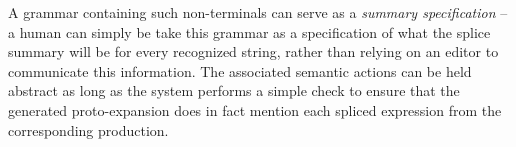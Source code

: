 \documentclass[acmlarge,review,anonymous]{acmart}\settopmatter{printfolios=true}
\begin{document}
A grammar containing such non-terminals can serve as a \emph{summary specification} -- a human can simply be take this grammar as a specification of what the splice summary will be for every recognized string, rather than relying on an editor to communicate this information. The associated semantic actions can be held abstract as long as the system performs a simple check to ensure that the generated proto-expansion does in fact mention each spliced expression from the corresponding production.



\end{document}
